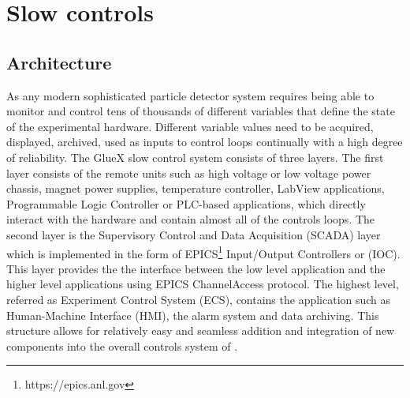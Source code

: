 
\section[Slow controls (Hovanes)]{Slow controls \label{sec:controls}}
\subsection{Architecture \label{sec:controlsarchitechture}}
As any modern sophisticated particle detector system \gx{} requires being able to monitor 
and control tens of thousands of different variables that define the state of the experimental hardware. Different variable values need to be acquired, displayed, archived, used as inputs to control loops continually with a high degree of reliability. The GlueX slow control system consists of three layers. The first layer consists of the remote units such as high voltage or low voltage power chassis, magnet power supplies, temperature controller, LabView applications, Programmable Logic Controller or PLC-based applications, which directly interact with the hardware and contain almost all of the controls loops. The second layer is the Supervisory Control and Data Acquisition (SCADA) layer which is implemented in the form of EPICS\footnote{https://epics.anl.gov} Input/Output Controllers or (IOC). This layer provides the the interface between the low level application and the higher level applications using EPICS ChannelAccess protocol. The highest level, referred as Experiment Control System (ECS), contains the application such as Human-Machine Interface (HMI), the alarm system and data archiving. This structure allows for relatively easy and seamless addition and integration of new components into the overall controls system of \gx{}. 

